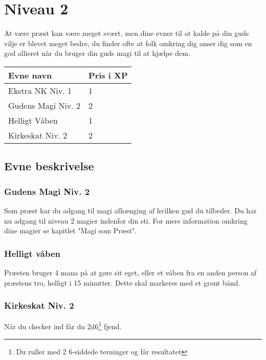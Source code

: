 \chapter*{Niveau 2}
At være præst kan være meget svært, men dine evner til at kalde på din guds vilje er blevet meget bedre, du finder ofte at folk omkring dig anser dig som en god allieret når du bruger din guds magi til at hjælpe dem.

\begin{table}[H]
    \centering
    \begin{tabular}{|p{}|p{}|}
    \rowcolor{cerulean!80}\hline
    Evne navn & Pris i XP \\\hline
        Ekstra NK Niv. 1 & 1 \\\hline
        Gudens Magi Niv. 2 & 2 \\\hline
        Helligt Våben & 1\\\hline
        Kirkeskat Niv. 2 & 2 \\\hline
    \end{tabular}
\end{table}
\section*{Evne beskrivelse}



\subsection*{Gudens Magi Niv. 2}
Som præst har du adgang til magi afhænging af hvilken gud du tilbeder. Du har nu adgang til niveau 2 magier indenfor din sti. For mere information omkring dine magier se kapitlet "Magi som Præst".

\subsection*{Helligt våben}
Præsten bruger 4 mana på at gøre sit eget, eller et våben fra en anden person af præstens tro, helligt i 15 minutter. Dette skal markeres med et grønt bånd.

\subsection*{Kirkeskat Niv. 2}
Når du checker ind får du 2d6\footnote{Du ruller med 2 6-siddede terninger og får resultatet} fjend.


